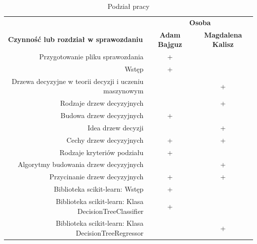 \documentclass[10pt,a4paper]{article}
\begin{document}
\begin{table}[ht]
	\centering
	\label{tab:podzial}
	\caption{Podział pracy}
	\begin{tabular}{rcc} 
	\hline
	\multicolumn{1}{c}{}                                              & \multicolumn{2}{c}{ \textbf{Osoba}}               \\ 
	\cline{2-3}
	\multicolumn{1}{c}{\textbf{Czynność lub rozdział w sprawozdaniu}} & \textbf{Adam Bajguz} & \textbf{Magdalena Kalisz}  \\ 
	\hline
	Przygotowanie pliku sprawozdania                                  & +                    &                            \\
	Wstęp                                                             & +                    &                            \\
	Drzewa decyzyjne w teorii decyzji i uczeniu maszynowym            &                      & +                          \\
	Rodzaje drzew decyzyjnych                                         &                      & +                          \\
	Budowa drzew decyzyjnych                                          & +                    &                            \\
	Idea drzew decyzji                                                &                      & +                          \\
	Cechy drzew decyzyjnych                                           & +                    & +                          \\
	Rodzaje kryteriów podziału                                        & +                    &                            \\
	~Algorytmy budowania drzew decyzyjnych                            &                      & +                          \\
	Przycinanie drzew decyzyjnych                                     & +                    & +                          \\
	Biblioteka scikit-learn: Wstęp                                    & +                    &                            \\
	Biblioteka scikit-learn: Klasa DecisionTreeClassifier             & +                    &                            \\
	Biblioteka scikit-learn: Klasa DecisionTreeRegressor              &                      & +                          \\

\end{tabular}
\end{table}
\end{document}

